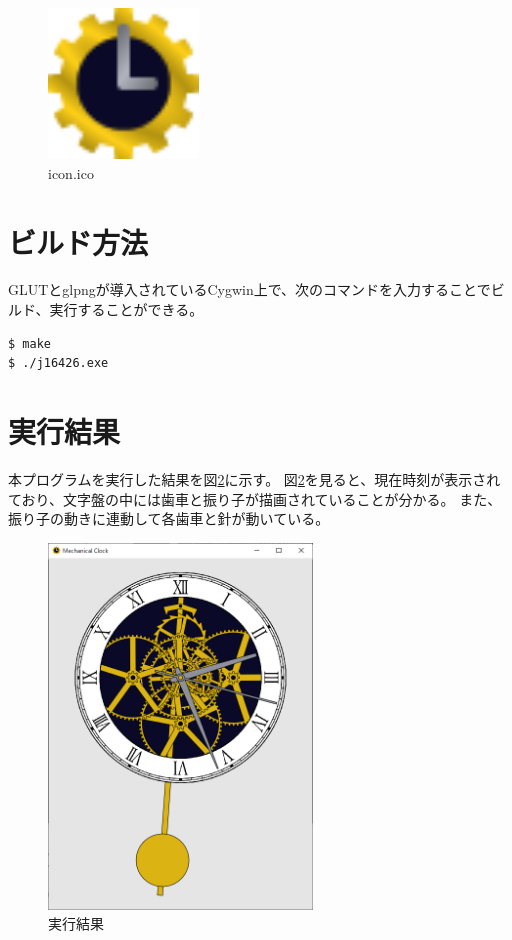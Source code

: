 \documentclass[a4j,titlepage]{jsarticle}
\begin{document}
\begin{figure}[H]
  \centering
  \includegraphics[width=4cm]{clock/icon-48.png}
  \caption{icon.ico}
  \label{fig:icon}
\end{figure}


\section{ビルド方法}
GLUTとglpngが導入されているCygwin上で、次のコマンドを入力することでビルド、実行することができる。

\begin{lstlisting}[style=text]
$ make
$ ./j16426.exe
\end{lstlisting}


\section{実行結果}
本プログラムを実行した結果を図\ref{fig:res1}に示す。
図\ref{fig:res1}を見ると、現在時刻が表示されており、文字盤の中には歯車と振り子が描画されていることが分かる。
また、振り子の動きに連動して各歯車と針が動いている。

\begin{figure}[H]
  \centering
  \includegraphics[width=7cm]{result1.png}
  \caption{実行結果}
  \label{fig:res1}
\end{figure}
\end{document}
